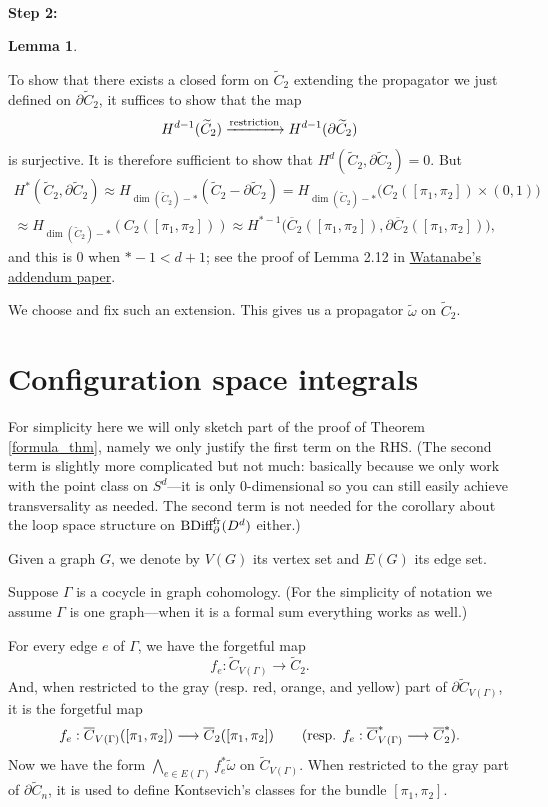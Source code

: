 \documentclass[11pt]{article}
\newtheorem{lmm}[thm]{Lemma}
\theoremstyle{definition}
\theoremstyle{remark}
\def\wt#1{\widetilde{#1}}
\def\ov#1{\overline{#1}}
\def\tn#1{\textnormal{#1}}
\begin{document}
~\\
{\bf Step 2:}


\begin{lmm}

\end{lmm}


To show that there exists a closed form on $\wt{C}_2$ extending the propagator we just defined on $\partial\wt{C}_2$, 
it suffices to show that the map 
$$H^{d-1}(\wt{C}_2)\xrightarrow{\tn{restriction}}H^{d-1}(\partial\wt{C}_2)$$
is surjective. 
It is therefore sufficient to show that $H^d(\wt{C}_2,\partial\wt{C}_2)=0$. But 
\begin{align*}
H^*(\wt{C}_2,\partial\wt{C}_2)\approx
H_{\dim(\wt{C}_2)-*}(\wt{C}_2-\partial\wt{C}_2)=
H_{\dim(\wt{C}_2)-*}\big(C_2([\pi_1,\pi_2])\times (0,1)\big)\\
\approx
H_{\dim(\wt{C}_2)-*}({C}_2([\pi_1,\pi_2]))
\approx H^{*-1}\big(\ov{C}_2([\pi_1,\pi_2]),\partial\ov{C}_2([\pi_1,\pi_2])\big), 
\end{align*}
and this is 0 when $*-1<d+1$; see the proof of Lemma 2.12 in \href{https://arxiv.org/pdf/2109.01609}{Watanabe's addendum paper}. 

We choose and fix such an extension. This gives us a propagator $\wt\omega$ on $\wt{C}_2$. 

\section{Configuration space integrals}

For simplicity here we will only sketch part of the proof of Theorem \ref{formula_thm}, namely we only justify the first term on the RHS. 
(The second term is slightly more complicated but not much: basically because we only work with the point class on $S^d$---it is only 0-dimensional so you can still easily achieve transversality as needed. The second term is not needed for the corollary about the loop space structure on $\tn{BDiff}^{\tn{fr}}_\partial(D^d)$ either.) 

Given a graph $G$, we denote by $V(G)$ its vertex set and $E(G)$ its edge set. 

Suppose $\Gamma$ is a cocycle in graph cohomology. (For the simplicity of notation we assume $\Gamma$ is one graph---when it is a formal sum everything works as well.)

For every edge $e$ of $\Gamma$, we have the forgetful map 
$$f_e:\wt{C}_{V(\Gamma)}\longrightarrow\wt{C}_2.$$
And, when restricted to the gray (resp. red, orange, and yellow) part of $\partial\wt{C}_{V(\Gamma)}$, it is the forgetful map
$$f_e:\ov{C}_{V(\Gamma)}([\pi_1,\pi_2])\longrightarrow\ov{C}_2([\pi_1,\pi_2]) \qquad (\tn{resp. } f_e:\ov{C}^*_{V(\Gamma)}\longrightarrow\ov{C}^*_2).$$
Now we have the form $\bigwedge_{e\in E(\Gamma)}f_e^*\wt{\omega}$ on $\wt{C}_{V(\Gamma)}$. 
When restricted to the gray part of $\partial\wt{C}_n$, it is used to define Kontsevich's classes for the bundle $[\pi_1,\pi_2]$. 
\end{document}
